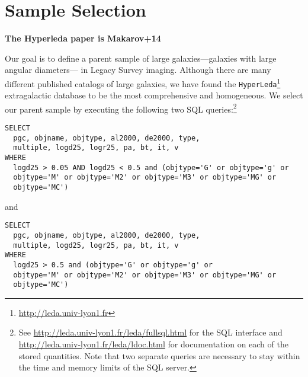 \section{Sample Selection}\label{sec:sample}

{\bf The Hyperleda paper is Makarov+14}

Our goal is to define a parent sample of large galaxies---galaxies with large
angular diameters--- in Legacy Survey imaging.
Although there are many different published catalogs of large galaxies, we have
found the {\tt HyperLeda}\footnote{\url{http://leda.univ-lyon1.fr}}
extragalactic database to be the most comprehensive and homogeneous.  We select
our parent sample by executing the following two SQL queries:\footnote{See
  \url{http://leda.univ-lyon1.fr/leda/fullsql.html} for the SQL interface and
  \url{http://leda.univ-lyon1.fr/leda/ldoc.html} for documentation on each of
  the stored quantities.  Note that two separate queries are necessary to stay
  within the time and memory limits of the SQL server.  }

\begin{verbatim}
SELECT
  pgc, objname, objtype, al2000, de2000, type, 
  multiple, logd25, logr25, pa, bt, it, v
WHERE 
  logd25 > 0.05 AND logd25 < 0.5 and (objtype='G' or objtype='g' or 
  objtype='M' or objtype='M2' or objtype='M3' or objtype='MG' or 
  objtype='MC')
\end{verbatim}

\noindent and

\begin{verbatim}
SELECT
  pgc, objname, objtype, al2000, de2000, type, 
  multiple, logd25, logr25, pa, bt, it, v
WHERE 
  logd25 > 0.5 and (objtype='G' or objtype='g' or 
  objtype='M' or objtype='M2' or objtype='M3' or objtype='MG' or 
  objtype='MC')
\end{verbatim}


